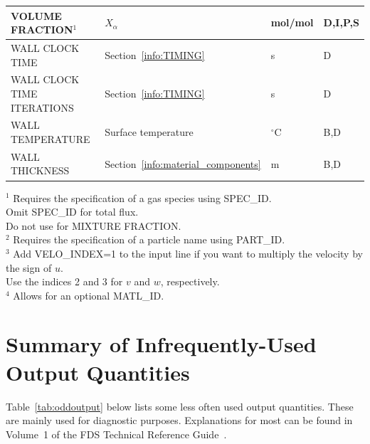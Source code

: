 \documentclass[11pt]{book}
\begin{document}
\begin{longtable}{@{\extracolsep{\fill}}|l|l|l|l|}
{\ct VOLUME FRACTION}$^1$                       & $X_\alpha$                                    & mol/mol        & D,I,P,S      \\ \hline
{\ct WALL CLOCK TIME}                           & Section~\ref{info:TIMING}                     & s              & D            \\ \hline
{\ct WALL CLOCK TIME ITERATIONS}                & Section~\ref{info:TIMING}                     & s              & D            \\ \hline
{\ct WALL TEMPERATURE}                          & Surface temperature                           & $^\circ$C      & B,D          \\ \hline
{\ct WALL THICKNESS}                            & Section~\ref{info:material_components}        & m              & B,D          \\ \hline
\end{longtable}

\noindent
\begin{tabbing}
$^1$  \hspace{0.05in} \= Requires the specification of a gas species using {\ct SPEC\_ID}. \\
                      \> Omit {\ct SPEC\_ID} for total flux. \\
                      \> Do not use for {\ct MIXTURE FRACTION}. \\
$^2$                  \> Requires the specification of a particle name using {\ct PART\_ID}. \\
$^3$                  \> Add {\ct VELO\_INDEX=1} to the input line if you want to multiply the velocity by the sign of $u$. \\
                      \> Use the indices 2 and 3 for $v$ and $w$, respectively.\\
$^4$                  \> Allows for an optional {\ct MATL\_ID}.

\end{tabbing}

\clearpage

\section{Summary of Infrequently-Used Output Quantities}
\label{info:oddoutputquantities}

Table~\ref{tab:oddoutput} below lists some less often used output quantities. These are mainly used for diagnostic purposes. Explanations for most can
be found in Volume~1 of the FDS Technical Reference Guide~\cite{FDS_Math_Guide}.
\end{document}
